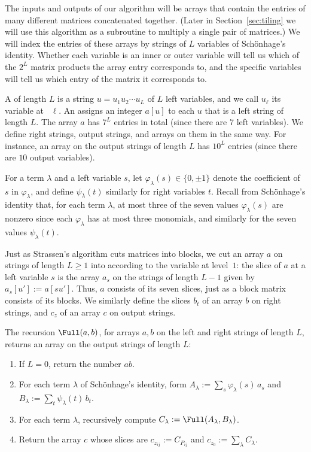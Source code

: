 The inputs and outputs of our algorithm will be arrays that contain the entries of many different matrices concatenated together. (Later in Section~\ref{sec:tiling} we will use this algorithm as a subroutine to multiply a single pair of matrices.) We will index the entries of these arrays by strings of $L$ variables of Sch\"onhage's identity. Whether each variable is an inner or outer variable will tell us which of the $2^L$ matrix products the array entry corresponds to, and the specific variables will tell us which entry of the matrix it corresponds to.

A  of length $L$ is a string $u=u_1u_2\cdots u_L$ of $L$ left variables, and we call $u_\ell$ its variable at ~$\ell$. An  assigns an integer $a[u]$ to each $u$ that is a left string of length $L$. The array $a$ has $7^L$ entries in total (since there are $7$ left variables). We define right strings, output strings, and arrays on them in the same way. For instance, an array on the output strings of length $L$ has $10^L$ entries (since there are $10$ output variables).

For a term $\lambda$ and a left variable $s$, let $\varphi_\lambda(s)\in\{0,\pm1\}$ denote the coefficient of $s$ in $\varphi_\lambda$, and define $\psi_\lambda(t)$ similarly for right variables $t$. Recall from Sch\"onhage's identity that, for each term $\lambda$, at most three of the seven values $\varphi_\lambda(s)$ are nonzero since each $\varphi_\lambda$ has at most three monomials, and similarly for the seven values $\psi_\lambda(t)$.

Just as Strassen's algorithm cuts matrices into blocks, we cut an array $a$ on strings of length $L\ge1$ into  according to the variable at level~$1$: the slice of $a$ at a left variable $s$ is the array $a_s$ on the strings of length $L-1$ given by $a_s[u']:=a[su']$. Thus, $a$ consists of its seven slices, just as a block matrix consists of its blocks. We similarly define the slices $b_t$ of an array $b$ on right strings, and $c_z$ of an array $c$ on output strings.

\smallskip
\noindent\begin{minipage}[t]{\linewidth}
The recursion $\Full(a,b)$, for arrays $a,b$ on the left and right strings of length $L$, returns an array on the output strings of length $L$:
\begin{enumerate}[label=(\arabic*),nosep]
\item If $L=0$, return the number $ab$.
\item For each term $\lambda$ of Sch\"onhage's identity, form $A_\lambda:=\sum_s\varphi_\lambda(s)\,a_s$ and $B_\lambda:=\sum_t\psi_\lambda(t)\,b_t$.
\item For each term $\lambda$, recursively compute $C_\lambda:=\Full(A_\lambda,B_\lambda)$.
\item Return the array $c$ whose slices are $c_{z_{ij}}:=C_{P_{ij}}$ and $c_{z_0}:=\sum_\lambda C_\lambda$.
\end{enumerate}
\end{minipage}
\medskip

